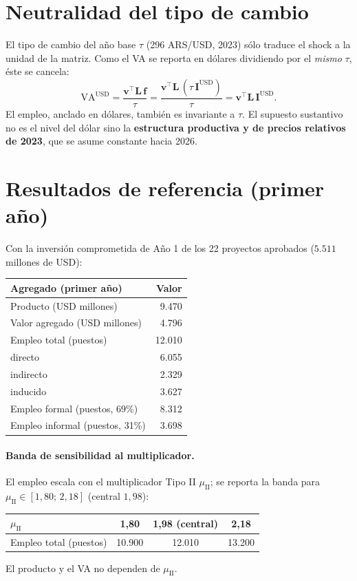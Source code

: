 \documentclass[11pt]{article}
\newcommand{\USD}{\mathrm{USD}}
\begin{document}
\section{Neutralidad del tipo de cambio}
El tipo de cambio del año base $\tau$ (296 ARS/USD, 2023) sólo traduce el shock a la unidad de la matriz. Como el VA se reporta en dólares dividiendo por el \emph{mismo} $\tau$, éste se cancela:
\begin{equation}
\mathrm{VA}^{\USD}=\frac{\mathbf{v}^{\!\top}\mathbf{L}\,\mathbf{f}}{\tau}=\frac{\mathbf{v}^{\!\top}\mathbf{L}\,(\tau\,\mathbf{I}^{\USD})}{\tau}=\mathbf{v}^{\!\top}\mathbf{L}\,\mathbf{I}^{\USD}.
\end{equation}
El empleo, anclado en dólares, también es invariante a $\tau$. El supuesto sustantivo no es el nivel del dólar sino la \textbf{estructura productiva y de precios relativos de 2023}, que se asume constante hacia 2026.

\section{Resultados de referencia (primer año)}
Con la inversión comprometida de Año 1 de los 22 proyectos aprobados ($5.511$ millones de USD):

\begin{center}\small
\begin{tabular}{lr}
\toprule
\textbf{Agregado (primer año)} & \textbf{Valor} \\
\midrule
Producto (USD millones) & 9.470 \\
Valor agregado (USD millones) & 4.796 \\
Empleo total (puestos) & 12.010 \\
\quad directo & 6.055 \\
\quad indirecto & 2.329 \\
\quad inducido & 3.627 \\
Empleo formal (puestos, 69\%) & 8.312 \\
Empleo informal (puestos, 31\%) & 3.698 \\
\bottomrule
\end{tabular}
\end{center}

\paragraph{Banda de sensibilidad al multiplicador.} El empleo escala con el multiplicador Tipo II $\mu_{\mathrm{II}}$; se reporta la banda para $\mu_{\mathrm{II}}\in[1{,}80;\,2{,}18]$ (central $1{,}98$):
\begin{center}\small
\begin{tabular}{lccc}
\toprule
$\mu_{\mathrm{II}}$ & 1{,}80 & 1{,}98 (central) & 2{,}18 \\
\midrule
Empleo total (puestos) & 10.900 & 12.010 & 13.200 \\
\bottomrule
\end{tabular}
\end{center}
El producto y el VA no dependen de $\mu_{\mathrm{II}}$.
\end{document}
